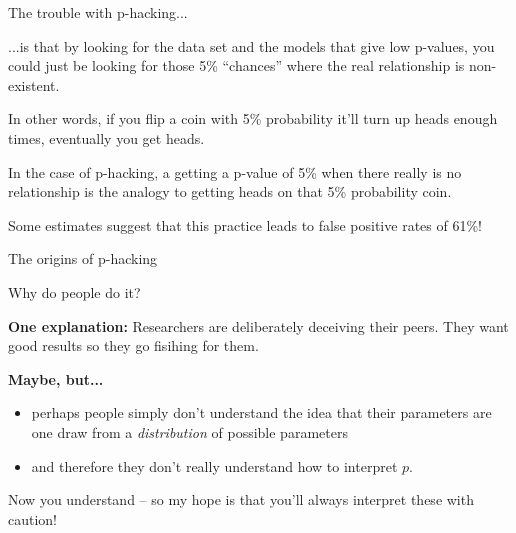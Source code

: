 \documentclass[aspectratio=169, handout]{beamer}
\begin{document}
\begin{frame}{The trouble with p-hacking...}

...is that by looking for the data set and the models that give low p-values, you could just be looking for those 5\% ``chances'' where the real relationship is non-existent.

\vspace{5mm}

In other words, if you flip a coin with 5\% probability it'll turn up heads enough times, eventually you get heads.

\vspace{5mm}

In the case of p-hacking, a getting a p-value of 5\% when there really is no relationship is the analogy to getting heads on that 5\% probability coin.
\vspace{5mm}
\pause

Some estimates suggest that this practice leads to false positive rates of 61\%!

\end{frame}


\begin{frame}{The origins of p-hacking}

Why do people do it?

\pause 

\vspace{5mm}
\textbf{One explanation:}  Researchers are deliberately deceiving their peers.  They want good results so they go fisihing for them.

\pause
\vspace{5mm}

\textbf{Maybe, but...} 
\begin{itemize}
  \item perhaps people simply don't understand the idea that their parameters are one draw from a \textit{distribution} of possible parameters
  \item and therefore they don't really understand how to interpret $p$.
\end{itemize}

\vspace{5mm}

Now you understand -- so my hope is that you'll always interpret these with caution!
\end{frame}
\end{document}
